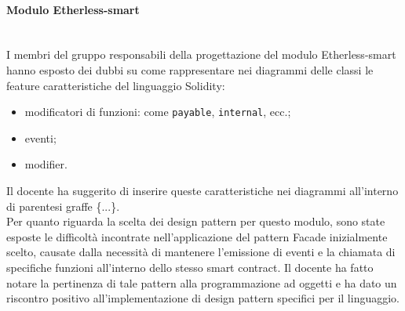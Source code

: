 	\paragraph{Modulo Etherless-smart}\mbox{}\\
		I membri del gruppo responsabili della progettazione del modulo Etherless-smart hanno esposto dei dubbi su come rappresentare nei diagrammi delle classi le feature caratteristiche del linguaggio Solidity:
		\begin{itemize}
			\item modificatori di funzioni: come \texttt{payable}, \texttt{internal}, ecc.;
			\item eventi;
			\item modifier.
		\end{itemize}
		Il docente ha suggerito di inserire queste caratteristiche nei diagrammi all'interno di parentesi graffe \{...\}.\\
		\newline
		Per quanto riguarda la scelta dei design pattern per questo modulo, sono state esposte le difficoltà incontrate nell'applicazione del pattern Facade inizialmente scelto, causate dalla necessità di mantenere l'emissione di eventi e la chiamata di specifiche funzioni all'interno dello stesso smart contract. Il docente ha fatto notare la pertinenza di tale pattern alla programmazione ad oggetti e ha dato un riscontro positivo all'implementazione di design pattern specifici per il linguaggio.
